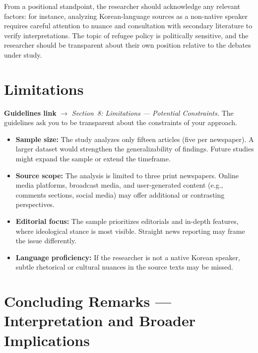 \documentclass[11pt,a4paper]{article}
\begin{document}
From a positional standpoint, the researcher should acknowledge any relevant factors: for instance, analyzing Korean-language sources as a non-native speaker requires careful attention to nuance and consultation with secondary literature to verify interpretations. The topic of refugee policy is politically sensitive, and the researcher should be transparent about their own position relative to the debates under study.


\section{Limitations}

\begin{crossrefbox}
\textbf{Guidelines link} $\rightarrow$ \textit{Section~8: Limitations --- Potential Constraints.} The guidelines ask you to be transparent about the constraints of your approach.
\end{crossrefbox}

\medskip

\begin{itemize}[nosep]
  \item \textbf{Sample size:} The study analyzes only fifteen articles (five per newspaper). A larger dataset would strengthen the generalizability of findings. Future studies might expand the sample or extend the timeframe.
  \item \textbf{Source scope:} The analysis is limited to three print newspapers. Online media platforms, broadcast media, and user-generated content (e.g., comments sections, social media) may offer additional or contrasting perspectives.
  \item \textbf{Editorial focus:} The sample prioritizes editorials and in-depth features, where ideological stance is most visible. Straight news reporting may frame the issue differently.
  \item \textbf{Language proficiency:} If the researcher is not a native Korean speaker, subtle rhetorical or cultural nuances in the source texts may be missed.
\end{itemize}


\section{Concluding Remarks --- Interpretation and Broader Implications}
\end{document}
